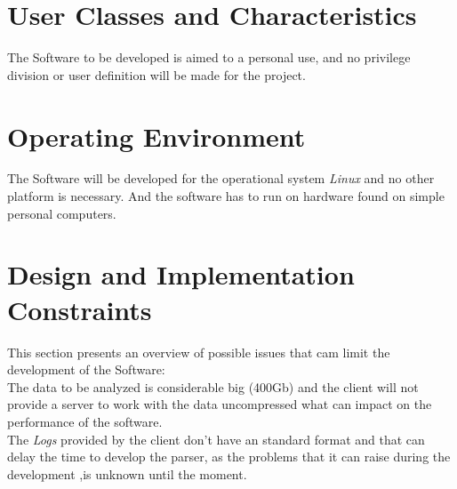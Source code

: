 \documentclass{scrreprt}
\begin{document}
\section{User Classes and Characteristics}
The Software to be developed is aimed to a personal use, and no privilege
division or user definition will be made for the project.
\section{Operating Environment}
The Software will be developed for the operational system \textit{Linux} and no
other platform is necessary.
And the software has to run on hardware found on simple personal computers.

\section{Design and Implementation Constraints}
This section presents an overview of possible issues that cam limit the
development of the Software:\\
The data to be analyzed is considerable big (400Gb) and the client will not provide a
server to work with the data uncompressed what can impact on the performance of
the software.\\
The \textit{Logs} provided by the client don't have an standard format and that
can delay the time to develop the parser, as the problems that it can raise
during the development ,is unknown until the moment.
\end{document}
